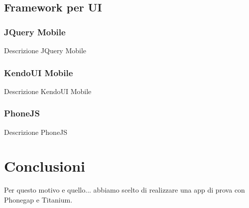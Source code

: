 			\subsection{Framework per UI}
			\label{sec:frameworkui}
	
				\subsubsection{JQuery Mobile}
					Descrizione JQuery Mobile
	
				\subsubsection{KendoUI Mobile}
					Descrizione KendoUI Mobile
	
				\subsubsection{PhoneJS}
					Descrizione PhoneJS

	\section{Conclusioni}
		Per questo motivo e quello... abbiamo scelto di realizzare una app di 
		prova con Phonegap e Titanium.
